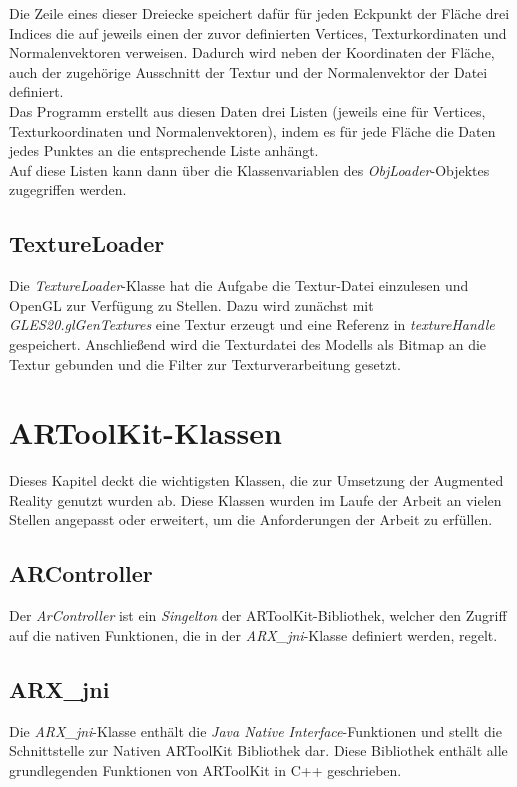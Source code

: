 Die Zeile eines dieser Dreiecke speichert dafür für jeden Eckpunkt der Fläche drei Indices die auf jeweils einen der  zuvor definierten Vertices, Texturkordinaten und Normalenvektoren verweisen. Dadurch wird neben der Koordinaten der Fläche, auch der zugehörige Ausschnitt der Textur und der Normalenvektor der Datei definiert. \\
Das Programm erstellt aus diesen Daten drei Listen (jeweils eine für Vertices, Texturkoordinaten und Normalenvektoren), indem es für jede Fläche die Daten jedes Punktes an die entsprechende Liste anhängt.\\
Auf diese Listen kann dann über die Klassenvariablen des \textit{ObjLoader}-Objektes zugegriffen werden.

\subsection{TextureLoader}
Die \textit{TextureLoader}-Klasse hat die Aufgabe die Textur-Datei einzulesen und OpenGL zur Verfügung zu Stellen. Dazu wird zunächst mit \textit{GLES20.glGenTextures} eine Textur erzeugt und eine Referenz in \textit{textureHandle} gespeichert. Anschließend wird die Texturdatei des Modells als Bitmap an die Textur gebunden und die Filter zur Texturverarbeitung gesetzt. 

\section{ARToolKit-Klassen}
Dieses Kapitel deckt die wichtigsten Klassen, die zur Umsetzung der Augmented Reality genutzt wurden ab. Diese Klassen wurden im Laufe der Arbeit an vielen Stellen angepasst oder erweitert, um die Anforderungen der Arbeit zu erfüllen.

\subsection{ARController}
Der \textit{ArController} ist ein \textit{Singelton} der ARToolKit-Bibliothek, welcher den Zugriff auf die nativen Funktionen, die in der \textit{ARX\_jni}-Klasse definiert werden, regelt. \\

\subsection{ARX\_jni}
Die \textit{ARX\_jni}-Klasse enthält die \textit{Java Native Interface}-Funktionen und stellt die Schnittstelle zur Nativen ARToolKit Bibliothek dar. Diese Bibliothek enthält alle grundlegenden Funktionen von ARToolKit in C++ geschrieben.

